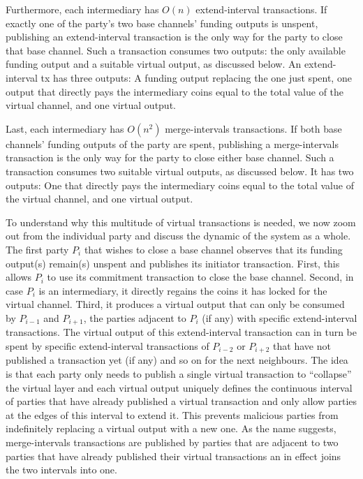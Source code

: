   Furthermore, each intermediary has $O(n)$ extend-interval transactions. If
  exactly one of the party's two base channels' funding outputs is unspent,
  publishing an extend-interval transaction is the only way for the party to
  close that base channel. Such a transaction consumes two outputs: the only
  available funding output and a suitable virtual output, as discussed below. An
  extend-interval tx has three outputs: A funding output replacing the one just
  spent, one output that directly pays the intermediary coins equal to the total
  value of the virtual channel, and one virtual output.

  Last, each intermediary has $O(n^2)$ merge-intervals transactions. If both
  base channels' funding outputs of the party are spent, publishing a merge-intervals
  transaction is the only way for the party to close either base channel. Such a
  transaction consumes two suitable virtual outputs, as discussed below. It has
  two outputs: One that directly pays the intermediary coins equal to the total
  value of the virtual channel, and one virtual output.

  To understand why this multitude of virtual transactions is needed, we now
  zoom out from the individual party and discuss the dynamic of the system as a
  whole. The first party $P_i$ that wishes to close a base channel observes that
  its funding output(s) remain(s) unspent and publishes its initiator
  transaction. First, this allows $P_i$ to use its commitment transaction to
  close the base channel. Second, in case $P_i$ is an intermediary, it directly
  regains the coins it has locked for the virtual channel. Third, it produces a
  virtual output that can only be consumed by $P_{i-1}$ and $P_{i+1}$, the
  parties adjacent to $P_i$ (if any) with specific extend-interval transactions.
  The virtual output of this extend-interval transaction can in turn be spent by
  specific extend-interval transactions of $P_{i-2}$ or $P_{i+2}$ that have not
  published a transaction yet (if any) and so on for the next neighbours. The
  idea is that each party only needs to publish a single virtual transaction to
  ``collapse'' the virtual layer and each virtual output uniquely defines the
  continuous interval of parties that have already published a virtual
  transaction and only allow parties at the edges of this interval to extend it.
  This prevents malicious parties from indefinitely replacing a virtual output
  with a new one. As the name suggests, merge-intervals transactions are
  published by parties that are adjacent to two parties that have already
  published their virtual transactions an in effect joins the two intervals into
  one.

